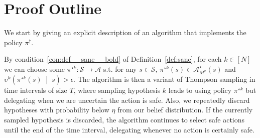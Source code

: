 \documentclass[anon,12pt]{colt2018} %
\newcommand{\Comment}[1]{}
\newcommand{\APM}[2]{\left(#1\;\middle\vert\;#2\right)}
\newcommand{\A}{\mathcal{A}}
\newcommand{\St}{\mathcal{S}}
\newcommand{\Tn}{\mathfrak{t}}
\newcommand{\Ad}{\upsilon}
\begin{document}
\Comment{The meaning of the factor $\bar{\Tn}+1$ in equation~(\ref{eqn:crl__balanced_regret_bound__RC}) might seem somewhat unclear, however, we can upper bound this factor in terms of parameters related to \emph{mixing time}: see Appendix~\ref{sec:mixing_time}.}

\section{Proof Outline}
\label{sec:outline}

We start by giving an explicit description of an algorithm that implements the policy $\pi^\dagger$.

By condition~\ref{con:def__sane__bold} of Definition~\ref{def:sane}, for each $k\in[N]$ we can choose some $\pi^{\star k}: \St \rightarrow \A$ s.t. for any $s \in \St$, $\pi^{\star k}(s) \in \A_{M^k}^\star(s)$ and $\Ad^k\APM{\pi^{\star k}(s)}{s} > \epsilon$. The algorithm is then a variant of Thompson sampling in time intervals of size $T$, where sampling hypothesis $k$ leads to using policy $\pi^{\star k}$ but delegating when we are uncertain the action is safe. Also, we repeatedly discard hypotheses with probability below $\eta$ from our belief distribution. If the currently sampled hypothesis is discarded, the algorithm continues to select safe actions until the end of the time interval, delegating whenever no action is certainly safe.\pagebreak

\LinesNumbered
\DontPrintSemicolon
{}
\end{document}
